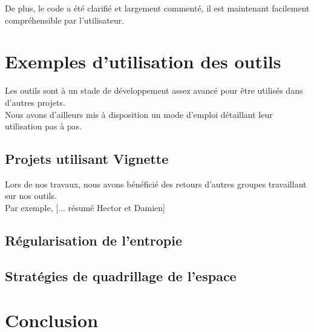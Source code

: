 \documentclass[12pt]{article}
\begin{document}
De plus, le code a été clarifié et largement commenté, il est maintenant facilement compréhensible par l’utilisateur. \\

\section{Exemples d'utilisation des outils}

Les outils sont à un stade de développement assez avancé pour être utilisés dans d'autres projets. \\

Nous avons d'ailleurs mis à disposition un mode d'emploi détaillant leur utilisation pas à pas. \\

\subsection{Projets utilisant Vignette}
Lors de nos travaux, nous avons bénéficié des retours d'autres groupes travaillant sur nos outils. \\

Par exemple, [... résumé Hector et Damien] \\


\subsection{Régularisation de l'entropie}

\subsection{Stratégies de quadrillage de l'espace}

\section*{Conclusion}
\end{document}
